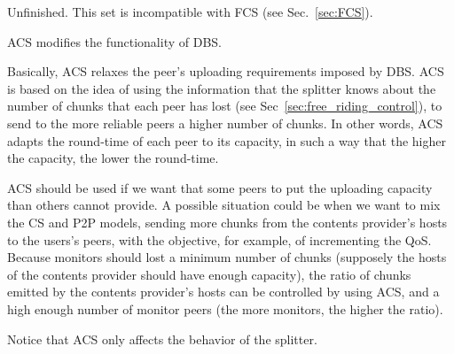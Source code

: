
\label{sec:ACS}

\begin{notex}
  Unfinished. This set is incompatible with FCS (see Sec.~\ref{sec:FCS}).
\end{notex}

ACS modifies the functionality of DBS.

Basically, ACS relaxes the peer's uploading requirements imposed by
DBS. ACS is based on the idea of using the information that the
splitter knows about the number of chunks that each peer has lost (see
Sec~\ref{sec:free_riding_control}), to send to the more reliable peers
a higher number of chunks. In other words, ACS adapts the round-time
of each peer to its capacity, in such a way that the higher the
capacity, the lower the round-time.

ACS should be used if we want that some peers to put the uploading
capacity than others cannot provide. A possible situation could be
when we want to mix the CS and P2P models, sending more chunks from
the contents provider's hosts to the users's peers, with the
objective, for example, of incrementing the QoS. Because monitors
should lost a minimum number of chunks (supposely the hosts of the
contents provider should have enough capacity), the ratio of chunks
emitted by the contents provider's hosts can be controlled by using
ACS, and a high enough number of monitor peers (the more monitors, the
higher the ratio).

Notice that ACS only affects the behavior of the splitter.

